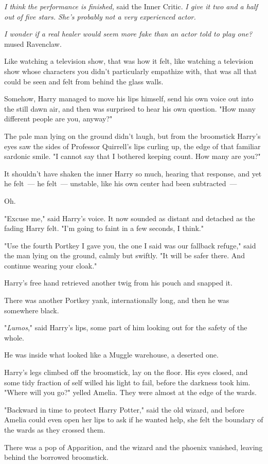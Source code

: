 \emph{I think the performance is finished,} said the Inner Critic. \emph{I give
it two and a half out of five stars. She's probably not a very experienced
actor.}

\emph{I wonder if a real healer would seem more fake than an actor told to play
one?} mused Ravenclaw.

Like watching a television show, that was how it felt, like watching a
television show whose characters you didn't particularly empathize with, that
was all that could be seen and felt from behind the glass walls.

Somehow, Harry managed to move his lips himself, send his own voice out into
the still dawn air, and then was surprised to hear his own question. "How many
different people are you, anyway?"

The pale man lying on the ground didn't laugh, but from the broomstick Harry's
eyes saw the sides of Professor Quirrell's lips curling up, the edge of that
familiar sardonic smile. "I cannot say that I bothered keeping count. How many
are you?"

It shouldn't have shaken the inner Harry so much, hearing that response, and
yet he felt~--- he felt~--- unstable, like his own center had been subtracted~---

Oh.

"Excuse me," said Harry's voice. It now sounded as distant and detached as the
fading Harry felt. "I'm going to faint in a few seconds, I think."

"Use the fourth Portkey I gave you, the one I said was our fallback refuge,"
said the man lying on the ground, calmly but swiftly. "It will be safer there.
And continue wearing your cloak."

Harry's free hand retrieved another twig from his pouch and snapped it.

There was another Portkey yank, internationally long, and then he was somewhere
black.

"\emph{Lumos}," said Harry's lips, some part of him looking out for the safety
of the whole.

He was inside what looked like a Muggle warehouse, a deserted one.

Harry's legs climbed off the broomstick, lay on the floor. His eyes closed, and
some tidy fraction of self willed his light to fail, before the darkness took
him.
\sbreak
"Where will you go?" yelled Amelia. They were almost at the edge of the wards.

"Backward in time to protect Harry Potter," said the old wizard, and before
Amelia could even open her lips to ask if he wanted help, she felt the boundary
of the wards as they crossed them.

There was a pop of Apparition, and the wizard and the phoenix vanished, leaving
behind the borrowed broomstick.
